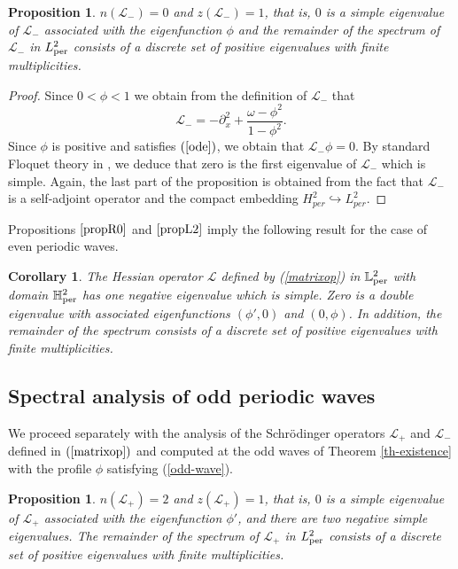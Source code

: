 \documentclass[12pt,reqno]{amsart}
\numberwithin{equation}{section}
\numberwithin{figure}{section}
\newtheorem{proposition}[theorem]{Proposition}
\newtheorem{corollary}[theorem]{Corollary}
\begin{document}
\begin{proposition}
	\label{propL2} 
$n(\mathcal{L}_-) = 0$ and $z(\mathcal{L}_-) = 1$, that is, 
	$0$ is a simple eigenvalue of $\mathcal{L}_{-}$ associated with the eigenfunction $\phi$ and the remainder of the spectrum of $\mathcal{L}_-$ in $L^2_{\rm per}$ consists of a discrete set of positive eigenvalues with finite multiplicities.
\end{proposition}

\begin{proof} 
	Since $0<\phi<1$ we obtain from the definition of $\mathcal{L}_{-}$ that 
	$$
\mathcal{L}_{-}=- \partial_x^2+ \frac{\omega-\phi^2}{1-\phi^2}.
	$$ 
	Since $\phi$ is positive and satisfies $(\ref{ode})$, we obtain that $\mathcal{L}_{-}\phi=0$. By standard Floquet theory in \cite{Magnus}, we deduce that zero is the first eigenvalue of $\mathcal{L}_{-}$ which is simple.  Again, the last part of the proposition is obtained from the fact that $\mathcal{L}_-$ is a self-adjoint operator and the compact embedding $H_{per}^2\hookrightarrow L_{per}^2.$
\end{proof}

Propositions $\ref{propR0}$ and $\ref{propL2}$ imply the following result for the case of even periodic waves.

\begin{corollary}
	\label{propL} 
The Hessian operator $\mathcal{L}$ defined by (\ref{matrixop}) in  $\mathbb{L}^2_{\rm per}$ with domain $\mathbb{H}^2_{\rm per}$ has one negative eigenvalue which is simple. Zero is a double eigenvalue with associated eigenfunctions $(\phi',0)$ and $(0,\phi)$.  In addition, the remainder of the spectrum consists of a discrete set of positive eigenvalues with finite multiplicities.
\end{corollary}

	 
	 
\subsection{Spectral analysis of odd periodic waves} 


We proceed separately with the analysis of the Schr\"{o}dinger operators $\mathcal{L}_+$ and $\mathcal{L}_-$ defined in $(\ref{matrixop})$ and computed at the odd waves of Theorem \ref{th-existence} with the profile $\phi$ satisfying (\ref{odd-wave}). 
		 
\begin{proposition}\label{propL11} 
$n(\mathcal{L}_+) = 2$ and $z(\mathcal{L}_+) = 1$, that is, 
	$0$ is a simple eigenvalue of $\mathcal{L}_{+}$ associated with the eigenfunction $\phi'$, and there are two negative simple eigenvalues. The remainder of the spectrum of $\mathcal{L}_+$ in $L^2_{\rm per}$ consists of a discrete set of positive eigenvalues with finite multiplicities.
\end{proposition}
\end{document}
